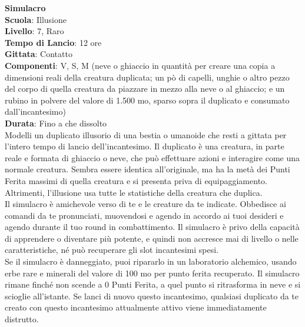 \begin{multicols}{2}
\medskip\textbf{Simulacro}\\
\textbf{Scuola}: Illusione\\
\textbf{Livello}: 7, Raro\\
\textbf{Tempo di Lancio}: 12 ore\\
\textbf{Gittata}: Contatto\\
\textbf{Componenti}: V, S, M (neve o ghiaccio in quantità per creare una copia a dimensioni reali della creatura duplicata; un pò di capelli, unghie o altro pezzo del corpo di quella creatura da piazzare in mezzo alla neve o al ghiaccio; e un rubino in polvere del valore di 1.500 mo, sparso sopra il duplicato e consumato dall'incantesimo)\\
\textbf{Durata}: Fino a che dissolto\\
Modelli un duplicato illusorio di una bestia o umanoide che resti a gittata per l'intero tempo di lancio dell'incantesimo. Il duplicato è una creatura, in parte reale e formata di ghiaccio o neve, che può effettuare azioni e interagire come una normale creatura. Sembra essere identica all'originale, ma ha la metà dei Punti Ferita massimi di quella creatura e si presenta priva di equipaggiamento. Altrimenti, l'illusione usa tutte le statistiche della creatura che duplica.\\
Il simulacro è amichevole verso di te e le creature da te indicate. Obbedisce ai comandi da te pronunciati, muovendosi e agendo in accordo ai tuoi desideri e agendo durante il tuo round in combattimento. Il simulacro è privo della capacità di apprendere o diventare più potente, e quindi non accresce mai di livello o nelle caratteristiche, né può recuperare gli slot incantesimi spesi.\\
Se il simulacro è danneggiato, puoi ripararlo in un laboratorio alchemico, usando erbe rare e minerali del valore di 100 mo per punto ferita recuperato. Il simulacro rimane finché non scende a 0 Punti Ferita, a quel punto si ritrasforma in neve e si scioglie all'istante. Se lanci di nuovo questo incantesimo, qualsiasi duplicato da te creato con questo incantesimo attualmente attivo viene immediatamente distrutto.


\end{multicols}
